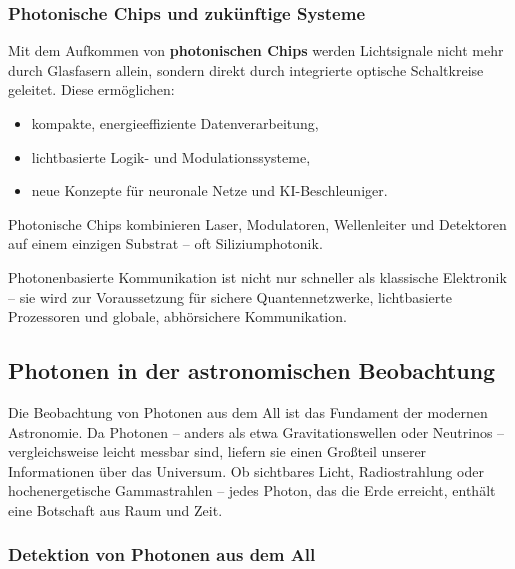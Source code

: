 \subsubsection{Photonische Chips und zukünftige Systeme}

Mit dem Aufkommen von \textbf{photonischen Chips} werden Lichtsignale nicht mehr durch Glasfasern allein, sondern direkt durch integrierte optische Schaltkreise geleitet. Diese ermöglichen:

\begin{itemize}
	\item kompakte, energieeffiziente Datenverarbeitung,
	\item lichtbasierte Logik- und Modulationssysteme,
	\item neue Konzepte für neuronale Netze und KI-Beschleuniger.
\end{itemize}

Photonische Chips kombinieren Laser, Modulatoren, Wellenleiter und Detektoren auf einem einzigen Substrat – oft Siliziumphotonik.

\begin{tcolorbox}[hinweisbox, title=Zukunft der photonischen Kommunikation] 
	\label{box:Zukunft Kommunikation}
	\small
	Photonenbasierte Kommunikation ist nicht nur schneller als klassische Elektronik – sie wird zur Voraussetzung für sichere Quantennetzwerke, lichtbasierte Prozessoren und globale, abhörsichere Kommunikation.
\end{tcolorbox}

\subsection{Photonen in der astronomischen Beobachtung}

Die Beobachtung von Photonen aus dem All ist das Fundament der modernen Astronomie. Da Photonen – anders als etwa Gravitationswellen oder Neutrinos – vergleichsweise leicht messbar sind, liefern sie einen Großteil unserer Informationen über das Universum. Ob sichtbares Licht, Radiostrahlung oder hochenergetische Gammastrahlen – jedes Photon, das die Erde erreicht, enthält eine Botschaft aus Raum und Zeit.

\subsubsection{Detektion von Photonen aus dem All}

